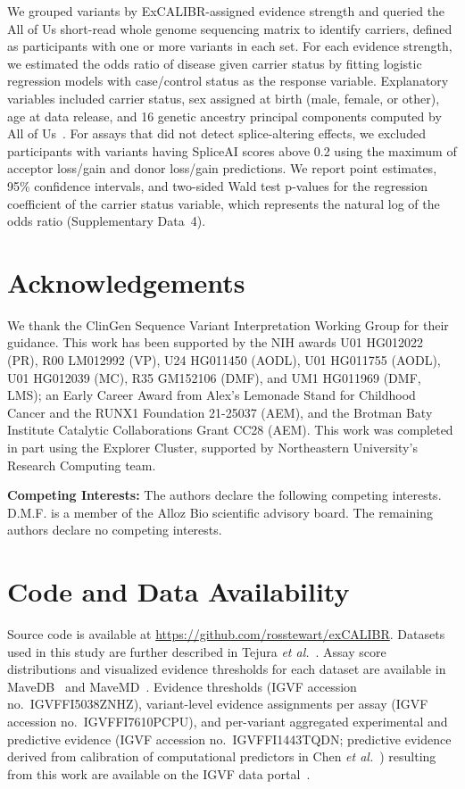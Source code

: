 \documentclass[11pt]{article}
\theoremstyle{plain}
\newcommand{\excalibr}{ExCALIBR\xspace}
\begin{document}
We grouped variants by \excalibr-assigned evidence strength and queried the All of Us short-read whole genome sequencing matrix to identify carriers, defined as participants with one or more variants in each set. For each evidence strength, we estimated the odds ratio of disease given carrier status by fitting logistic regression models with case/control status as the response variable. Explanatory variables included carrier status, sex assigned at birth (male, female, or other), age at data release, and 16 genetic ancestry principal components computed by All of Us~\cite{allofus_genomicdata2024}. For assays that did not detect splice-altering effects, we excluded participants with variants having SpliceAI scores above 0.2 using the maximum of acceptor loss/gain and donor loss/gain predictions. We report point estimates, 95\% confidence intervals, and two-sided Wald test p-values for the regression coefficient of the carrier status variable, which represents the natural log of the odds ratio (Supplementary Data~4).

\section*{Acknowledgements}
We thank the ClinGen Sequence Variant Interpretation Working Group for their guidance. This work has been supported by the NIH awards U01 HG012022 (PR), R00 LM012992 (VP), U24 HG011450 (AODL), U01 HG011755 (AODL), U01 HG012039 (MC), R35 GM152106 (DMF), and UM1 HG011969 (DMF, LMS); an Early Career Award from Alex's Lemonade Stand for Childhood Cancer and the RUNX1 Foundation 21-25037 (AEM), and the Brotman Baty Institute Catalytic Collaborations Grant CC28 (AEM). This work was completed in part using the Explorer Cluster, supported by Northeastern University’s Research Computing team.

\smallskip 
\noindent\textbf{Competing Interests:} The authors declare the following competing interests. D.M.F. is a member of the Alloz Bio scientific advisory board. The remaining authors declare no competing interests.

\section*{Code and Data Availability}

Source code is available at \url{https://github.com/rosstewart/exCALIBR}. Datasets used in this study are further described in Tejura \textit{et al.}~\cite{igvf_pp}. Assay score distributions and visualized evidence thresholds for each dataset are available in MaveDB~\cite{rubin2025_mavedb} and MaveMD~\cite{McEwen2025}. Evidence thresholds (IGVF accession no.~IGVFFI5038ZNHZ), variant-level evidence assignments per assay (IGVF accession no.~IGVFFI7610PCPU), and per-variant aggregated experimental and predictive evidence (IGVF accession no.~IGVFFI1443TQDN; predictive evidence derived from calibration of computational predictors in Chen \textit{et al.}~\cite{chen2026calibration}) resulting from this work are available on the IGVF data portal~\cite{Li2026}.
\end{document}
